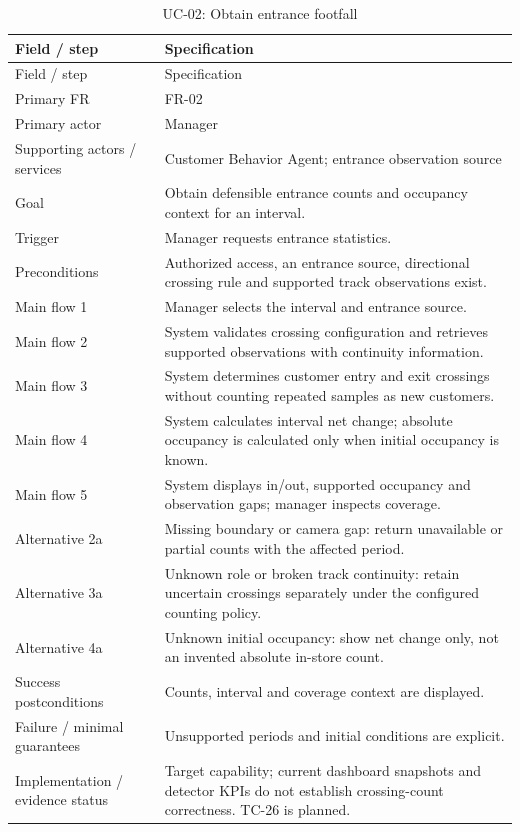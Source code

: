 \begin{longtable}{P{0.23\textwidth}P{0.67\textwidth}}
\caption{UC-02: Obtain entrance footfall}\\
\toprule
Field / step & Specification\\
\midrule
\endfirsthead
\toprule
Field / step & Specification\\
\midrule
\endhead
Primary FR & FR-02\\
Primary actor & Manager\\
Supporting actors / services & Customer Behavior Agent; entrance observation source\\
Goal & Obtain defensible entrance counts and occupancy context for an interval.\\
Trigger & Manager requests entrance statistics.\\
Preconditions & Authorized access, an entrance source, directional crossing rule and supported track observations exist.\\
Main flow 1 & Manager selects the interval and entrance source.\\
Main flow 2 & System validates crossing configuration and retrieves supported observations with continuity information.\\
Main flow 3 & System determines customer entry and exit crossings without counting repeated samples as new customers.\\
Main flow 4 & System calculates interval net change; absolute occupancy is calculated only when initial occupancy is known.\\
Main flow 5 & System displays in/out, supported occupancy and observation gaps; manager inspects coverage.\\
Alternative 2a & Missing boundary or camera gap: return unavailable or partial counts with the affected period.\\
Alternative 3a & Unknown role or broken track continuity: retain uncertain crossings separately under the configured counting policy.\\
Alternative 4a & Unknown initial occupancy: show net change only, not an invented absolute in-store count.\\
Success postconditions & Counts, interval and coverage context are displayed.\\
Failure / minimal guarantees & Unsupported periods and initial conditions are explicit.\\
Implementation / evidence status & Target capability; current dashboard snapshots and detector KPIs do not establish crossing-count correctness. TC-26 is planned.\\
\bottomrule
\end{longtable}

